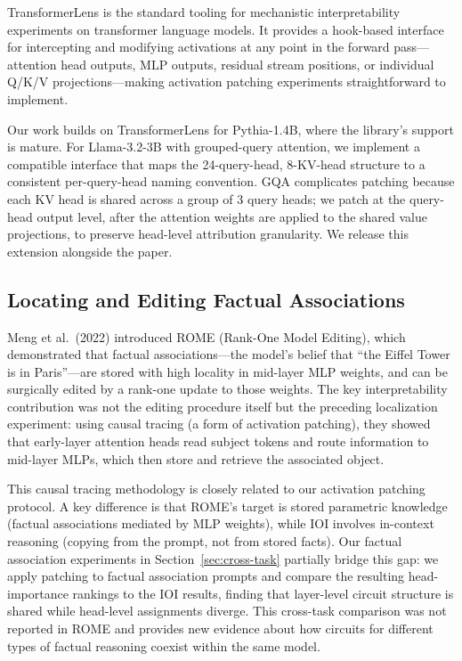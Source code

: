\documentclass[11pt,a4paper]{article}
\begin{document}
TransformerLens \citep{nanda2022transformerlens} is the standard tooling for
mechanistic interpretability experiments on transformer language models. It provides a
hook-based interface for intercepting and modifying activations at any point in the
forward pass---attention head outputs, MLP outputs, residual stream positions, or
individual Q/K/V projections---making activation patching experiments straightforward
to implement.

Our work builds on TransformerLens for Pythia-1.4B, where the library's support is
mature. For Llama-3.2-3B with grouped-query attention, we implement a compatible
interface that maps the 24-query-head, 8-KV-head structure to a consistent
per-query-head naming convention. GQA complicates patching because each KV head is
shared across a group of 3 query heads; we patch at the query-head output level, after
the attention weights are applied to the shared value projections, to preserve
head-level attribution granularity. We release this extension alongside the paper.

\subsection{Locating and Editing Factual Associations}

Meng et al.\ (2022) \citep{meng2022locating} introduced ROME (Rank-One Model Editing),
which demonstrated that factual associations---the model's belief that ``the Eiffel
Tower is in Paris''---are stored with high locality in mid-layer MLP weights, and can
be surgically edited by a rank-one update to those weights. The key interpretability
contribution was not the editing procedure itself but the preceding localization
experiment: using causal tracing (a form of activation patching), they showed that
early-layer attention heads read subject tokens and route information to mid-layer
MLPs, which then store and retrieve the associated object.

This causal tracing methodology is closely related to our activation patching protocol.
A key difference is that ROME's target is stored parametric knowledge (factual
associations mediated by MLP weights), while IOI involves in-context reasoning (copying
from the prompt, not from stored facts). Our factual association experiments in
Section~\ref{sec:cross-task} partially bridge this gap: we apply patching to factual
association prompts and compare the resulting head-importance rankings to the IOI
results, finding that layer-level circuit structure is shared while head-level
assignments diverge. This cross-task comparison was not reported in ROME and provides
new evidence about how circuits for different types of factual reasoning coexist within
the same model.
\end{document}
